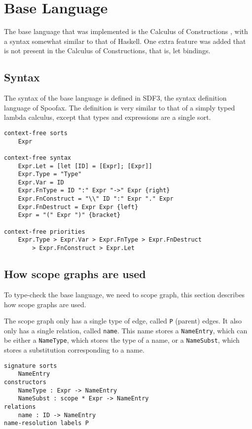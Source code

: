 
\chapter{\label{chap:baselang}Base Language}

The base language that was implemented is the Calculus of Constructions \autocite{Coquand_Huet_1988}, with a syntax somewhat similar to that of Haskell. One extra feature was added that is not present in the Calculus of Constructions, that is, let bindings.

\section{Syntax}

The syntax of the base language is defined in SDF3, the syntax definition language of Spoofax. The definition is very similar to that of a simply typed lambda calculus, except that types and expressions are a single sort. 

\begin{lstlisting}
context-free sorts
	Expr
	
context-free syntax
	Expr.Let = [let [ID] = [Expr]; [Expr]]
	Expr.Type = "Type"
	Expr.Var = ID
	Expr.FnType = ID ":" Expr "->" Expr {right}
	Expr.FnConstruct = "\\" ID ":" Expr "." Expr
	Expr.FnDestruct = Expr Expr {left}
	Expr = "(" Expr ")" {bracket}

context-free priorities
	Expr.Type > Expr.Var > Expr.FnType > Expr.FnDestruct 
		> Expr.FnConstruct > Expr.Let
\end{lstlisting}

\section{How scope graphs are used}

To type-check the base language, we need to scope graph, this section describes how scope graphs are used.

The scope graph only has a single type of edge, called \verb|P| (parent) edges. It also only has a single relation, called \verb|name|. This name stores a \verb|NameEntry|, which can be either a \verb|NameType|, which stores the type of a name, or a \verb|NameSubst|, which stores a substitution corresponding to a name. 

\begin{lstlisting}
signature sorts
	NameEntry
constructors
	NameType : Expr -> NameEntry
	NameSubst : scope * Expr -> NameEntry
relations
	name : ID -> NameEntry
name-resolution	labels P
\end{lstlisting}


